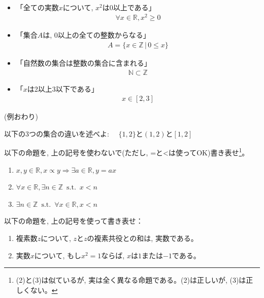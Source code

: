 \begin{exmpl}　
\begin{itemize}
\item 「全ての実数$x$について, $x^2$は0以上である」
\begin{eqnarray}\forall x \in \mathbb{R}, x^2 \geq 0\end{eqnarray}
\item 「集合$A$は, 0以上の全ての整数からなる」
\begin{eqnarray}A=\{x \in \mathbb{Z}\,|\,0 \leq x\}\end{eqnarray}
\item 「自然数の集合は整数の集合に含まれる」
\begin{eqnarray}\mathbb{N} \subset \mathbb{Z}\end{eqnarray}
\item 「$x$は2以上3以下である」
\begin{eqnarray}x \in [2, 3]\end{eqnarray}
\end{itemize}
(例おわり)\end{exmpl}
\mv

\begin{q}\label{q:logic_kigou} 以下の3つの集合の違いを述べよ:　
$\{1, 2\}$と$(1, 2)$と$[1, 2]$
\end{q}
\mv


\begin{q}\label{q:logic_meidai5}
以下の命題を, 上の記号を使わないで(ただし, =と<は使ってOK)書き表せ\footnote{(2)と(3)は似ているが, 
実は全く異なる命題である。(2)は正しいが, (3)は正しくない。}。 
\begin{enumerate}
\item $x, y \in \mathbb{R}, x \propto y \Longrightarrow \exists a \in \mathbb{R}, y=ax$
\item $\forall x \in \mathbb{R}, \exists n \in \mathbb{Z}\,\,\, \text{s.t.}\,\,\, x<n$
\item $\exists n \in \mathbb{Z}\,\,\, \text{s.t.}\,\,\, \forall x \in \mathbb{R}, x<n$
\end{enumerate}
\end{q}
\mv

\begin{q}\label{q:logic_meidai6} 
以下の命題を, 上の記号を使って書き表せ：
\begin{enumerate}
\item 複素数$z$について, $z$と$z$の複素共役との和は, 実数である。
\item 実数$x$について, もし$x^2=1$ならば, $x$は$1$または$-1$である。
\end{enumerate}
\end{q}

